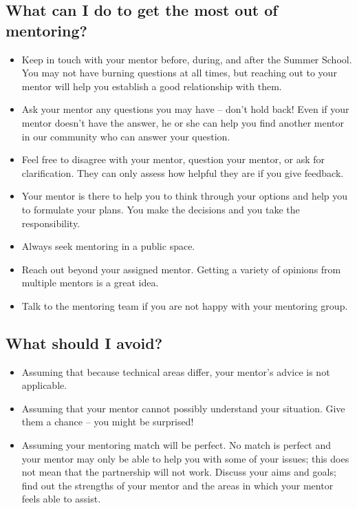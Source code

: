 \documentclass[titlepage]{article}
\begin{document}
\subsection{What can I do to get the most out of mentoring?}
\label{sec:org41d358c}
\begin{itemize}
\item Keep in touch with your mentor before, during, and after the Summer School. You may not have burning questions at all times, but reaching out to your mentor will help you establish a good relationship with them.
\item Ask your mentor any questions you may have – don't hold back! Even if your mentor doesn't have the answer, he or she can help you find another mentor in our community who can answer your question.
\item Feel free to disagree with your mentor, question your mentor, or ask for clarification. They can only assess how helpful they are if you give feedback.
\item Your mentor is there to help you to think through your options and help you to formulate your plans. You make the decisions and you take the responsibility.
\item Always seek mentoring in a public space.
\item Reach out beyond your assigned mentor. Getting a variety of opinions from multiple mentors is a great idea.
\item Talk to the mentoring team if you are not happy with your mentoring group.
\end{itemize}
\subsection{What should I avoid?}
\label{sec:org5901ebd}
\begin{itemize}
\item Assuming that because technical areas differ, your mentor's advice is not applicable.
\item Assuming that your mentor cannot possibly understand your situation. Give them a chance – you might be surprised!
\item Assuming your mentoring match will be perfect. No match is perfect and your mentor may only be able to help you with some of your issues; this does not mean that the partnership will not work. Discuss your aims and goals; find out the strengths of your mentor and the areas in which your mentor feels able to assist.
\end{itemize}
\end{document}
